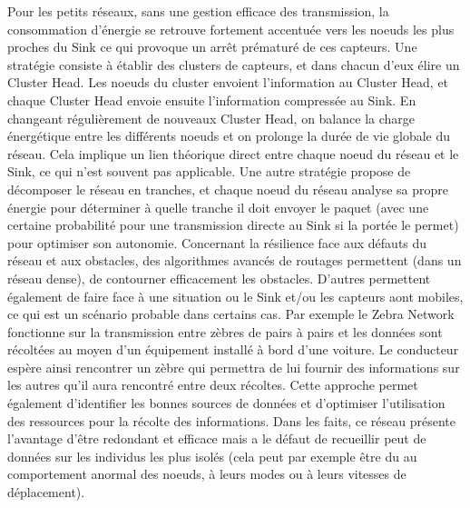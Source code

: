 \documentclass[10pt, article]{llncs}
\begin{document}
			Pour les petits réseaux, sans une gestion efficace des transmission, la consommation d'énergie se retrouve fortement accentuée vers les noeuds les plus proches du Sink ce qui provoque un arrêt prématuré de ces capteurs. Une stratégie consiste à établir des clusters de capteurs, et dans chacun d'eux élire un Cluster Head. Les noeuds du cluster envoient l'information au Cluster Head, et chaque Cluster Head envoie ensuite l'information compressée au Sink. En changeant régulièrement de nouveaux Cluster Head, on balance la charge énergétique entre les différents noeuds et on prolonge la durée de vie globale du réseau. Cela implique un lien théorique direct entre chaque noeud du réseau et le Sink, ce qui n'est souvent pas applicable. Une autre stratégie propose de décomposer le réseau en tranches, et chaque noeud du réseau analyse sa propre énergie pour déterminer à quelle tranche il doit envoyer le paquet (avec une certaine probabilité pour une transmission directe au Sink si la portée le permet) pour optimiser son autonomie. Concernant la résilience face aux défauts du réseau et aux obstacles, des algorithmes avancés de routages permettent (dans un réseau dense), de contourner efficacement les obstacles. D'autres permettent également de faire face à une situation ou le Sink et/ou les capteurs aont mobiles, ce qui est un scénario probable dans certains cas. Par exemple le Zebra Network fonctionne sur la transmission entre zèbres de pairs à pairs et les données sont récoltées au moyen d'un équipement installé à bord d'une voiture. Le conducteur espère ainsi rencontrer un zèbre qui permettra de lui fournir des informations sur les autres qu'il aura rencontré entre deux récoltes. Cette approche permet également d'identifier les bonnes sources de données et d'optimiser l'utilisation des ressources pour la récolte des informations. Dans les faits, ce réseau présente l'avantage d'être redondant et efficace mais a le défaut de recueillir peut de données sur les individus les plus isolés (cela peut par exemple être du au comportement anormal des noeuds, à leurs modes ou à leurs vitesses de déplacement). 


	
		
\end{document}
